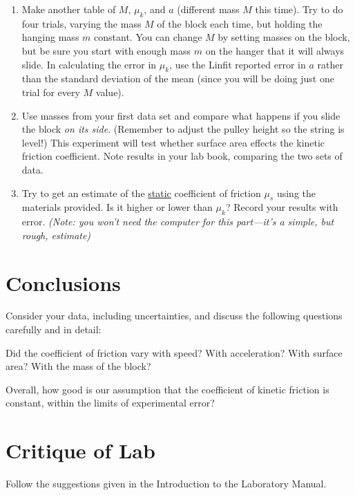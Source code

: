 \begin{enumerate}
\item Make another table of $M$, $\mu_{k}$, and $a$ (different
mass $M$ this time).
Try to do four trials, varying the mass $M$ of
the block each time, but holding the hanging mass $m$ constant.
You can change $M$ by setting masses on the block, but be sure you
start with enough mass $m$ on the hanger that it will always slide.
In calculating the error in $\mu_{k}$,
use the Linfit reported error in $a$ rather than the standard deviation
of the mean (since you will be doing just one trial for every
$M$ value).
%
\item  Use masses from your first data set and compare what happens
if you slide the block {\em on its side}.  (Remember to adjust the
pulley height so the string is level!) This experiment will test
whether surface area effects
the kinetic friction coefficient.  Note results in your lab book, comparing the two sets
of data.
%
\item Try to get an estimate of the \underline{static} coefficient of friction
$\mu_{s}$ using the materials provided.
Is it higher or lower than $\mu_{k}$?  Record your results with error.
{\em (Note: you won't need the computer for this part---it's a
simple, but rough, estimate)}
%
\end{enumerate}

\section*{Conclusions}
Consider your data, including uncertainties, and discuss the
following questions carefully and in detail:

Did the coefficient of friction vary
with speed?
With acceleration? With surface area? With the mass of the block?

Overall, how good is our assumption that the coefficient of kinetic
friction is constant, within the limits of experimental error?


\section*{Critique of Lab}
     Follow the suggestions given in the Introduction to the
Laboratory Manual.

